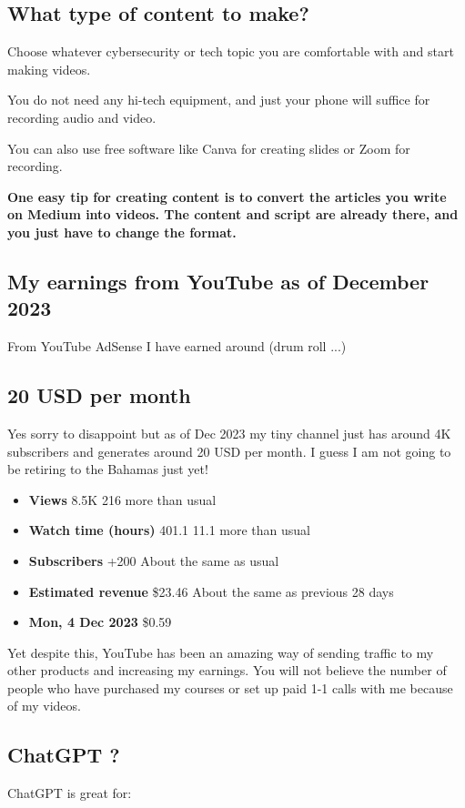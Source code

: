 \documentclass[11pt]{article}
\begin{document}
\subsection*{What type of content to make?}
Choose whatever cybersecurity or tech topic you are comfortable with and start making videos.

You do not need any hi-tech equipment, and just your phone will suffice for recording audio and video.

You can also use free software like Canva for creating slides or Zoom for recording.

\textbf{One easy tip for creating content is to convert the articles you write on Medium into videos. The content and script are already there, and you just have to change the format.}

\subsection*{My earnings from YouTube as of December 2023}
From YouTube AdSense I have earned around (drum roll ...)

\subsection*{20 USD per month}
Yes sorry to disappoint but as of Dec 2023 my tiny channel just has around 4K subscribers and generates around 20 USD per month. I guess I am not going to be retiring to the Bahamas just yet!

\begin{itemize}
\item \textbf{Views} 8.5K 216 more than usual
\item \textbf{Watch time (hours)} 401.1 11.1 more than usual
\item \textbf{Subscribers} +200 About the same as usual
\item \textbf{Estimated revenue} \$23.46 About the same as previous 28 days
\item \textbf{Mon, 4 Dec 2023} \$0.59
\end{itemize}

Yet despite this, YouTube has been an amazing way of sending traffic to my other products and increasing my earnings. You will not believe the number of people who have purchased my courses or set up paid 1-1 calls with me because of my videos.

\subsection*{ChatGPT ?}
ChatGPT is great for:
\end{document}
